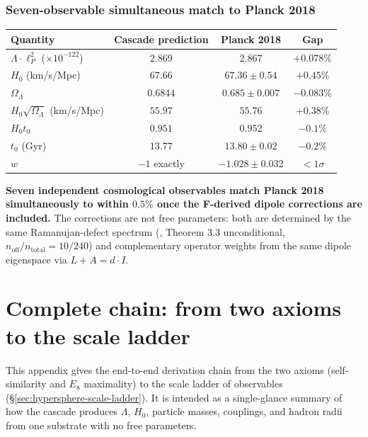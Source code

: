 \documentclass[11pt]{article}
\theoremstyle{plain}
\theoremstyle{definition}
\theoremstyle{remark}
\begin{document}
\subsubsection*{Seven-observable simultaneous match to Planck 2018}

\begin{center}
\renewcommand{\arraystretch}{1.25}
\begin{tabular}{lccc}
\toprule
Quantity & Cascade prediction & Planck 2018 & Gap \\
\midrule
$\Lambda \cdot \ell_P^2$ ($\times 10^{-122}$) & $2.869$ & $2.867$ & $+0.078\%$ \\
$H_0$ (km/s/Mpc) & $67.66$ & $67.36 \pm 0.54$ & $+0.45\%$ \\
$\Omega_\Lambda$ & $0.6844$ & $0.685 \pm 0.007$ & $-0.083\%$ \\
$H_0\sqrt{\Omega_\Lambda}$ (km/s/Mpc) & $55.97$ & $55.76$ & $+0.38\%$ \\
$H_0 t_0$ & $0.951$ & $0.952$ & $-0.1\%$ \\
$t_0$ (Gyr) & $13.77$ & $13.80 \pm 0.02$ & $-0.2\%$ \\
$w$ & $-1$ exactly & $-1.028 \pm 0.032$ & $< 1\sigma$ \\
\bottomrule
\end{tabular}
\end{center}

\textbf{Seven independent cosmological observables match Planck 2018 simultaneously to within $0.5\%$ once the F-derived dipole corrections are included.} The corrections are not free parameters: both are determined by the same Ramanujan-defect spectrum (\citealp{rhTwoSphere}, Theorem 3.3 unconditional, $n_\mathrm{off}/n_\mathrm{total} = 10/240$) and complementary operator weights from the same dipole eigenspace via $L + A = d \cdot I$.

\section{Complete chain: from two axioms to the scale ladder}\label{app:chain}

This appendix gives the end-to-end derivation chain from the two axioms (self-similarity and $E_8$ maximality) to the scale ladder of observables (\S\ref{sec:hypersphere-scale-ladder}). It is intended as a single-glance summary of how the cascade produces $\Lambda$, $H_0$, particle masses, couplings, and hadron radii from one substrate with no free parameters.
\end{document}
